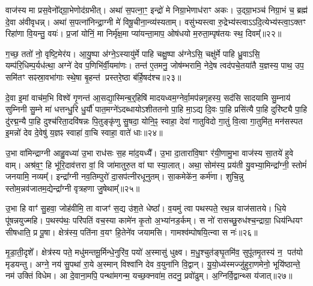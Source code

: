 {\anuvakamend[{अह्रु॑त॒ एक॑विꣳशतिश्च। (12)}]}

वाज॑स्य मा प्रस॒वेनो᳚द्ग्रा॒भेणोद॑ग्रभीत्। अथा॑ स॒पत्ना॒ꣳ॒ इन्द्रो॑ मे निग्रा॒भेणाध॑राꣳ अकः। उ॒द्ग्रा॒भञ्च॑ निग्रा॒भं च॒ ब्रह्म॑ दे॒वा अ॑वीवृधन्न्। अथा॑ स॒पत्ना॑निन्द्रा॒ग्नी मे॑ विषू॒चीना॒न्व्य॑स्यताम्। वसु॑भ्यस्त्वा रु॒द्रेभ्य॑स्त्वा\-ऽ\-ऽदि॒त्येभ्य॑स्त्वा॒ऽक्तꣳ रिहा॑णा वि॒यन्तु॒ वयः॑। प्र॒जां योनिं॒ मा निर्मृ॑क्ष॒मा प्या॑यन्ता॒माप॒ ओष॑धयो म॒रुता॒म्पृष॑तयः स्थ॒ दिवम्᳚॥२२॥

ग॒च्छ॒ ततो॑ नो॒ वृष्टि॒मेर॑य। आ॒यु॒ष्पा अ॑ग्ने॒\-ऽस्यायु॑र्मे पाहि चक्षु॒ष्पा अ॑ग्ने\-ऽसि॒ चक्षु॑र्मे पाहि ध्रु॒वा\-ऽसि॒ यम्प॑रि॒धिम्प॒र्यध॑त्था॒ अग्ने॑ देव प॒णिभि॑र्वी॒यमा॑णः। तन्त॑ ए॒तमनु॒ जोष॑म्भरामि॒ नेदे॒ष त्वद॑पचे॒तया॑तै य॒ज्ञस्य॒ पाथ॒ उप॒ समि॑तꣳ सꣴस्रा॒वभा॑गाः स्थे॒षा बृ॒हन्त॑ प्रस्तरे॒ष्ठा ब॑र्\mbox{}हि॒षद॑श्च॥२३॥

दे॒वा इ॒मां वाच॑म॒भि विश्वे॑ गृ॒णन्त॑ आ॒सद्या॒स्मिन्ब॒र्॒हिषि॑ मादयध्वम॒ग्नेर्वा॒मप॑न्नगृहस्य॒ सद॑सि सादयामि सु॒म्नाय॑ सुम्निनी सु॒म्ने मा॑ धत्तन्धु॒रि धु॒र्यौ॑ पात॒मग्ने॑\-ऽदब्धायो\-ऽशीततनो पा॒हि मा॒\-ऽद्य दि॒वः पा॒हि प्रसि॑त्यै पा॒हि दुरि॑ष्ट्यै पा॒हि दु॑रद्म॒न्यै पा॒हि दुश्च॑रिता॒दवि॑षन्नः पि॒तुङ्कृ॑णु सु॒षदा॒ योनि॒ꣴ॒ स्वाहा॒ देवा॑ गातुविदो गा॒तुं वि॒त्वा गा॒तुमि॑त॒ मन॑सस्पत इ॒मन्नो॑ देव दे॒वेषु॑ य॒ज्ञꣴ स्वाहा॑ वा॒चि स्वाहा॒ वाते॑ धाः॥२४॥

{\anuvakamend[{दिव॑ञ्च वि॒त्वा गा॒तुन्त्रयो॑दश च। (13)}]}

उ॒भा वा॑मिन्द्राग्नी आहु॒वध्या॑ उ॒भा राध॑सः स॒ह मा॑द॒यध्यै᳚। उ॒भा दा॒तारा॑वि॒षाꣳ र॑यी॒णामु॒भा वाज॑स्य सा॒तये॑ हुवे वाम्। अश्र॑व॒ꣳ॒ हि भू॑रि॒दाव॑त्तरा वां॒ वि जा॑मातुरु॒त वा॑ घा स्या॒लात्। अथा॒ सोम॑स्य॒ प्रय॑ती यु॒वभ्या॒मिन्द्रा᳚ग्नी॒ स्तोमं॑ जनयामि॒ नव्यम्᳚। इन्द्रा᳚ग्नी नव॒तिम्पुरो॑ दा॒सप॑त्नीरधूनुतम्। सा॒कमेके॑न॒ कर्म॑णा। शुचि॒न्नु स्तोम॒न्नव॑जातम॒द्येन्द्रा᳚ग्नी वृत्रहणा जु॒षेथाम्᳚॥२५॥

उ॒भा हि वाꣳ॑ सु॒हवा॒ जोह॑वीमि॒ ता वाजꣳ॑ स॒द्य उ॑श॒ते धेष्ठा᳚। व॒यमु॑ त्वा पथस्पते॒ रथ॒न्न वाज॑सातये। धि॒ये पू॑षन्नयुज्महि। प॒थस्प॑थः॒ परि॑पतिं वच॒स्या कामे॑न कृ॒तो अ॒भ्या॑नड॒र्कम्। स नो॑ रासच्छु॒रुध॑श्च॒न्द्राग्रा॒ धिय॑न्धियꣳ सीषधाति॒ प्र पू॒षा। क्षेत्र॑स्य॒ पति॑ना व॒यꣳ हि॒तेने॑व जयामसि। गामश्व॑म्पोषयि॒त्न्वा स नः॑॥२६॥

मृ॒डा॒ती॒दृशे᳚। क्षेत्र॑स्य पते॒ मधु॑मन्तमू॒र्मिन्धे॒नुरि॑व॒ पयो॑ अ॒स्मासु॑ धुक्ष्व। म॒धु॒श्चुत॑ङ्घृ॒तमि॑व॒ सुपू॑तमृ॒तस्य॑ न॒ पत॑यो मृडयन्तु। अग्ने॒ नय॑ सु॒पथा॑ रा॒ये अ॒स्मान् विश्वा॑नि देव व॒युना॑नि वि॒द्वान्। यु॒यो॒ध्य॑स्मज्जु॑हुरा॒णमेनो॒ भूयि॑ष्ठान्ते॒ नम॑ उक्तिं विधेम। आ दे॒वाना॒मपि॒ पन्था॑मगन्म॒ यच्छ॒क्नवा॑म॒ तदनु॒ प्रवो॑ढुम्। अ॒ग्निर्वि॒द्वान्थ्स य॑जात्॥२७॥

